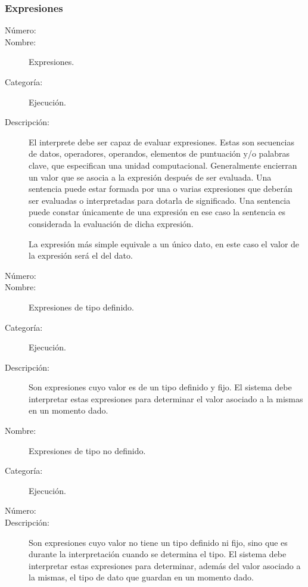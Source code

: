 \subsubsection{Expresiones}
\begin{framed}
	\begin{description}
		\item [Número:] \cn
		\item [Nombre:] Expresiones.
		\item [Categoría:] Ejecución.
		\item [Descripción:] El interprete debe ser capaz de evaluar expresiones. Estas son secuencias de datos, operadores, operandos,
		elementos de puntuación y/o palabras clave, que especifican una unidad computacional.
		Generalmente encierran un valor que se asocia a la expresión después de ser evaluada. Una sentencia puede estar formada por una o
		varias expresiones que deberán ser evaluadas o interpretadas para dotarla de significado. Una sentencia puede constar únicamente
		de una expresión en ese caso la sentencia es considerada la evaluación de dicha expresión.
		
		La expresión más simple equivale a un único dato, en este caso el valor de la expresión será el del dato.
	\end {description}
\end{framed}

\begin{framed}
	\begin{description}
		\item [Número:] \cn
		\item [Nombre:] Expresiones de tipo definido.
		\item [Categoría:] Ejecución.
		\item [Descripción:] Son expresiones cuyo valor es de un tipo definido y fijo. El sistema debe interpretar estas expresiones para determinar el valor
		asociado a la mismas en un momento dado.
	\end {description}
\end{framed}

\begin{framed}
	\begin{description}
		\item [Nombre:] Expresiones de tipo no definido.
		\item [Categoría:] Ejecución.
		\item [Número:] \cn
		\item [Descripción:] Son expresiones cuyo valor no tiene un tipo definido ni fijo, sino que es durante la interpretación cuando se determina el tipo.
		El sistema debe interpretar estas expresiones para determinar, además del valor asociado a la mismas, el tipo de dato que guardan en un momento
		dado.
	\end {description}
\end{framed}

